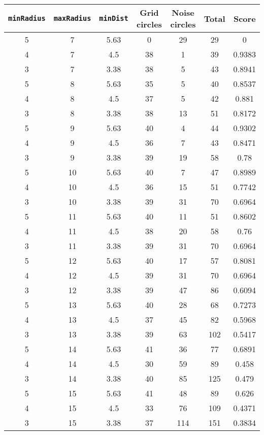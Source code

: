 \documentclass[letterpaper, 12pt]{article}
\begin{document}
\begin{longtable}{|c|c|c|c|c|c|c|}
\hline
\textbf{\texttt{minRadius}} & \textbf{\texttt{maxRadius}} & \textbf{\texttt{minDist}} & \textbf{Grid circles} & \textbf{Noise circles} & \textbf{Total} & \textbf{Score} \\
\hline
5 & 7 & 5.63 & 0 & 29 & 29 & 0 \\
\hline
4 & 7 & 4.5 & 38 & 1 & 39 & 0.9383 \\
\hline
3 & 7 & 3.38 & 38 & 5 & 43 & 0.8941 \\
\hline
5 & 8 & 5.63 & 35 & 5 & 40 & 0.8537 \\
\hline
4 & 8 & 4.5 & 37 & 5 & 42 & 0.881 \\
\hline
3 & 8 & 3.38 & 38 & 13 & 51 & 0.8172 \\
\hline
5 & 9 & 5.63 & 40 & 4 & 44 & 0.9302 \\
\hline
4 & 9 & 4.5 & 36 & 7 & 43 & 0.8471 \\
\hline
3 & 9 & 3.38 & 39 & 19 & 58 & 0.78 \\
\hline
5 & 10 & 5.63 & 40 & 7 & 47 & 0.8989 \\
\hline
4 & 10 & 4.5 & 36 & 15 & 51 & 0.7742 \\
\hline
3 & 10 & 3.38 & 39 & 31 & 70 & 0.6964 \\
\hline
5 & 11 & 5.63 & 40 & 11 & 51 & 0.8602 \\
\hline
4 & 11 & 4.5 & 38 & 20 & 58 & 0.76 \\
\hline
3 & 11 & 3.38 & 39 & 31 & 70 & 0.6964 \\
\hline
5 & 12 & 5.63 & 40 & 17 & 57 & 0.8081 \\
\hline
4 & 12 & 4.5 & 39 & 31 & 70 & 0.6964 \\
\hline
3 & 12 & 3.38 & 39 & 47 & 86 & 0.6094 \\
\hline
5 & 13 & 5.63 & 40 & 28 & 68 & 0.7273 \\
\hline
4 & 13 & 4.5 & 37 & 45 & 82 & 0.5968 \\
\hline
3 & 13 & 3.38 & 39 & 63 & 102 & 0.5417 \\
\hline
5 & 14 & 5.63 & 41 & 36 & 77 & 0.6891 \\
\hline
4 & 14 & 4.5 & 30 & 59 & 89 & 0.458 \\
\hline
3 & 14 & 3.38 & 40 & 85 & 125 & 0.479 \\
\hline
5 & 15 & 5.63 & 41 & 48 & 89 & 0.626 \\
\hline
4 & 15 & 4.5 & 33 & 76 & 109 & 0.4371 \\
\hline
3 & 15 & 3.38 & 37 & 114 & 151 & 0.3834 \\

\end{longtable}
\end{document}
